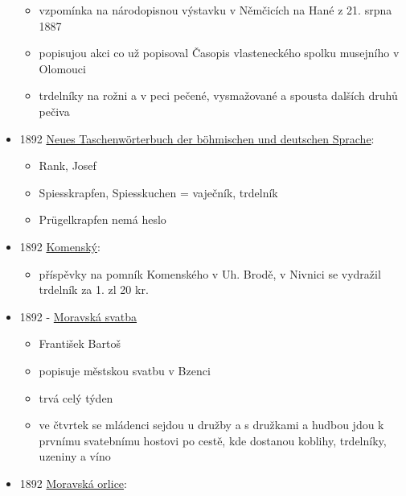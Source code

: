 \begin{itemize}
  \begin{itemize}
  \tightlist
  \item
    vzpomínka na národopisnou výstavku v Němčicích na Hané z 21. srpna
    1887
  \item
    popisujou akci co už popisoval Časopis vlasteneckého spolku
    musejního v Olomouci
  \item
    trdelníky na rožni a v peci pečené, vysmažované a spousta dalších
    druhů pečiva
  \end{itemize}
\item
  1892
  \href{https://ceskadigitalniknihovna.cz/uuid/uuid:0869a320-dc1a-11e6-9e7e-001018b5eb5c}{Neues
  Taschenwörterbuch der böhmischen und deutschen Sprache}:

  \begin{itemize}
  \tightlist
  \item
    Rank, Josef
  \item
    Spiesskrapfen, Spiesskuchen = vaječník, trdelník
  \item
    Prügelkrapfen nemá heslo
  \end{itemize}
\item
  1892
  \href{https://www.google.cz/books/edition/Komensk\%C3\%BD/twVGAQAAMAAJ?hl=cs&gbpv=1&dq=trdeln\%C3\%ADk&pg=RA2-PA181&printsec=frontcover}{Komenský}:

  \begin{itemize}
  \tightlist
  \item
    příspěvky na pomník Komenského v Uh. Brodě, v Nivnici se vydražil
    trdelník za 1. zl 20 kr.
  \end{itemize}
\item
  1892 -
  \href{https://ndk.cz/view/uuid:289bb2c0-9f1e-11dc-bf2d-000d606f5dc6?page=uuid\%3Aca676860-e56d-11e7-8cdd-5ef3fc9bb22f&fulltext=trdeln\%C3\%ADky}{Moravská
  svatba}

  \begin{itemize}
  \tightlist
  \item
    František Bartoš
  \item
    popisuje městskou svatbu v Bzenci
  \item
    trvá celý týden
  \item
    ve čtvrtek se mládenci sejdou u družby a s družkami a hudbou jdou k
    prvnímu svatebnímu hostovi po cestě, kde dostanou koblihy,
    trdelníky, uzeniny a víno
  \end{itemize}
\item
  1892
  \href{https://ceskadigitalniknihovna.cz/uuid/uuid:04f469ce-32f0-11de-992b-00145e5790ea}{Moravská
  orlice}:


\end{itemize}
